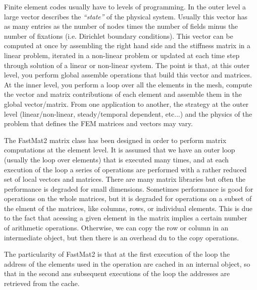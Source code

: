 

Finite element codes usually have to levels of programming.
In the outer level a large vector describes the \emph{``state''} of
the physical system. Usually this vector has as many entries as the
number of nodes times the number of fields minus the number of
fixations (i.e. Dirichlet boundary conditions). This vector can be
computed at once by assembling the right hand side and the stiffness
matrix in a linear problem, iterated in a non-linear problem or
updated at each time step through solution of a linear or non-linear
system. The point is that, at this outer level, you perform global
assemble operations that build this vector and matrices. At the inner
level, you perform a loop over all the elements in the mesh, compute
the vector and matrix contributions of each element and assemble them
in the global vector/matrix. From one application to another, the
strategy at the outer level (linear/non-linear, steady/temporal
dependent, etc...) and the physics of the problem that defines the
FEM matrices and vectors may vary. 

The FastMat2 matrix class has been designed in order to perform matrix
computations at the element level. It is assumed that we have an outer
loop (usually the loop over elements) that is executed many times, and
at each execution of the loop a series of operations are performed
with a rather reduced set of local vectors and matrices. There are
many matrix libraries but often the performance is degraded for small
dimensions. Sometimes performance is good for operations on the whole
matrices, but it is degraded for operations on a subset of the elment
of the matrices, like columns, rows, or individual elements. 
This is due to the fact that acessing a given element in the matrix
implies a certain number of arithmetic operations. Otherwise, we can
copy the row or column in an intermediate object, but then there is an
overhead du to the copy operations. 

The particularity of FastMat2 is that at the first execution of the
loop the address of the elements used in the operation are cached in
an internal object, so that in the second ans subsequent executions of
the loop the addresses are retrieved from the cache. 

\label{sec:fastmat2_example}  

